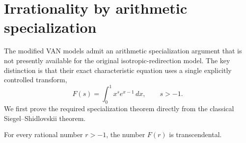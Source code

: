 \section{Irrationality by arithmetic specialization}
\label{vana:section}

The modified VAN models admit an arithmetic specialization argument
that is not presently available for the original isotropic-redirection
model.  The key distinction is that their exact characteristic equation
uses a single explicitly controlled transform,
\begin{equation}\label{vana:F}
 F(s)=\int_0^1 x^s e^{x-1}\,dx,\qquad s>-1.
\end{equation}
We first prove the required specialization theorem directly from the
classical Siegel--Shidlovskii theorem.

\begin{theorem}
\label{vana:rational-specialization}
For every rational number $r>-1$, the number $F(r)$ is transcendental.
\end{theorem}

